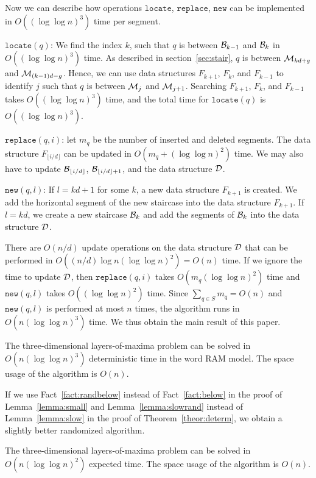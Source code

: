 \documentclass[10pt]{llncs}
\def\idtt#1{\ensuremath{\mathtt{#1}}}
\newenvironment{itemize*}{\begin{itemize}\setlength{\itemsep}{0pt}\setlength{\parskip}{0pt}\setlength{\parsep}{0pt}\setlength{\topsep}{0pt}\setlength{\partopsep}{0pt}}{\end{itemize}}
\newcommand{\cD}{{\cal D}}
\newcommand{\cM}{{\cal M}}
\newcommand{\cB}{{\cal B}}
\newcommand{\replace}{\idtt{replace}}
\newcommand{\locate}{\idtt{locate}}
\newcommand{\new}{\idtt{new}}
\begin{document}
Now we can describe how operations $\locate$, $\replace$, $\new$ can 
be implemented in $O((\log \log n)^3)$ time per segment. 
\begin{itemize*}
\item
$\locate(q)$: We find the index $k$, such that $q$ is between  
$\cB_{k-1}$ and $\cB_k$ in $O((\log \log n)^3)$ time. 
As described in section~\ref{sec:stair}, $q$ is between $\cM_{kd+g}$ 
and $\cM_{(k-1)d-g}$. Hence, we can use  data structures
$F_{k+1}$, $F_k$, and $F_{k-1}$ to identify $j$ such that 
$q$ is between  $\cM_j$ and $\cM_{j+1}$. 
Searching $F_{k+1}$, $F_k$, and $F_{k-1}$ takes $O((\log \log n)^3)$ 
time, and the total time for $\locate(q)$ is $O((\log \log n)^3)$.
\item
$\replace(q, i)$: let $m_q$ be the number of inserted and deleted 
segments. The data structure $F_{\lfloor i/d \rfloor}$ 
can be updated in $O(m_q+ (\log\log n)^2)$ time. We may also have to update 
$\cB_{\lfloor i/d \rfloor}$, $\cB_{\lfloor i/d \rfloor+1}$, and the data structure
 $\cD$.
\item
$\new(q,l)$: If $l=kd+1$ for some $k$, a new data structure $F_{k+1}$ is
 created. We add the horizontal segment of the new staircase into 
the data structure $F_{k+1}$. 
If $l=kd$, we create a new staircase $\cB_k$ and add the segments of 
$\cB_k$ into the data structure $\cD$.
\end{itemize*}
There are $O(n/d)$ update operations on the data structure $\cD$
that can be performed in $O((n/d)\log n(\log\log n)^2)=O(n)$ time. 
If we ignore the time to update $\cD$, then $\replace(q,i)$ takes 
$O(m_q(\log\log n)^2)$ time and $\new(q,l)$ takes $O((\log\log n)^2)$ time. 
Since $\sum_{q\in S} m_q=O(n)$ and $\new(q,l)$ is performed 
at most $n$ times, the algorithm runs in $O(n (\log \log n)^3)$ 
time. We thus obtain the main result of this paper.
\begin{theorem}\label{theor:determ}
The three-dimensional layers-of-maxima problem can be solved in 
$O(n (\log \log n)^3 )$ deterministic time in the word RAM model. 
The space usage of the algorithm is $O(n)$.
\end{theorem}
If we use Fact~\ref{fact:randbelow} instead of Fact~\ref{fact:below} 
in the proof of Lemma~\ref{lemma:small} and Lemma~\ref{lemma:slowrand} 
instead of Lemma~\ref{lemma:slow} in the proof of Theorem~\ref{theor:determ}, 
we  obtain a slightly better randomized algorithm. 
\begin{theorem}
The three-dimensional layers-of-maxima problem 
can be solved in $O(n (\log \log n)^2 )$ expected time. 
The space usage of the algorithm is $O(n)$.
\end{theorem}
\end{document}
